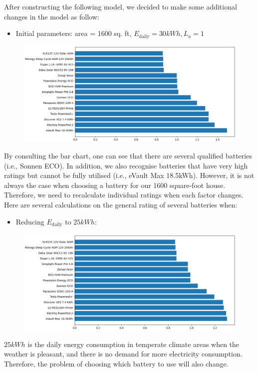 After constructing the following model, we decided to make some additional changes in the model as follow:
\begin{itemize}
    \item Initial parameters: area = 1600 sq. ft, $E_\text{daily} = 30kWh, L_a = 1$
\end{itemize}
\begin{figure}[H]
\centering
\includegraphics[scale=0.4]{src/1.png}
\end{figure}
By consulting the bar chart, one can see that there are several qualified batteries (i.e., Sonnen ECO). In addition, we also recognise batteries that have very high ratings but cannot be fully utilised (i.e., eVault Max 18.5kWh). However, it is not always the case when choosing a battery for our 1600 square-foot house. Therefore, we need to recalculate individual ratings when each factor changes. Here are several calculations on the general rating of several batteries when:
\begin{itemize}
    \item Reducing $E_\text{daily}$ to $25kWh$:
\end{itemize}
\begin{figure}[H]
\centering
\includegraphics[scale=0.4]{src/2.png}
\end{figure}
$25kWh$ is the daily energy consumption in temperate climate areas when the weather is pleasant, and there is no demand for more electricity consumption. Therefore, the problem of choosing which battery to use will also change.
